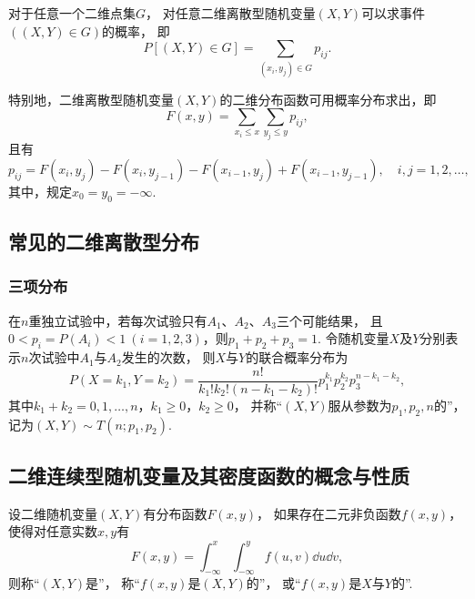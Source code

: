 \begin{theorem}
对于任意一个二维点集\(G\)，
对任意二维离散型随机变量\((X,Y)\)可以求事件\(((X,Y) \in G)\)的概率，
即\begin{equation*}
	P\left[(X,Y) \in G\right] = \sum_{(x_i,y_j) \in G} p_{ij}.
\end{equation*}

特别地，二维离散型随机变量\((X,Y)\)的二维分布函数可用概率分布求出，即\begin{equation*}
	F(x,y) = \sum_{x_i \leq x}\sum_{y_j \leq y} p_{ij},
\end{equation*}且有\begin{equation*}
	p_{ij} = F(x_i,y_j) - F(x_i,y_{j-1}) - F(x_{i-1},y_j) + F(x_{i-1},y_{j-1}),
	\quad i,j = 1,2,\dotsc,
\end{equation*}
其中，规定\(x_0 = y_0 = -\infty\).
\end{theorem}

\subsection{常见的二维离散型分布}
\subsubsection{三项分布}
\begin{definition}
在\(n\)重独立试验中，若每次试验只有\(A_1\)、\(A_2\)、\(A_3\)三个可能结果，
且\(0 < p_i = P(A_i) < 1\ (i=1,2,3)\)，则\(p_1 + p_2 + p_3 = 1\).
令随机变量\(X\)及\(Y\)分别表示\(n\)次试验中\(A_1\)与\(A_2\)发生的次数，
则\(X\)与\(Y\)的联合概率分布为\begin{equation*}
	P(X=k_1,Y=k_2)
	= \frac{n!}{k_1! k_2! (n-k_1-k_2)!} p_1^{k_1} p_2^{k_2} p_3^{n-k_1-k_2},
\end{equation*}
其中\(k_1+k_2 = 0,1,\dotsc,n\)，\(k_1 \geq 0\)，\(k_2 \geq 0\)，
并称“\((X,Y)\)服从参数为\(p _1,p_2,n\)的”，
记为\((X,Y) \sim T(n;p_1,p_2)\).
\end{definition}

\subsection{二维连续型随机变量及其密度函数的概念与性质}
\begin{definition}
设二维随机变量\((X,Y)\)有分布函数\(F(x,y)\)，
如果存在二元非负函数\(f(x,y)\)，
使得对任意实数\(x,y\)有\begin{equation*}
	F(x,y) = \int_{-\infty}^x \int_{-\infty}^y f(u,v) \dd{u} \dd{v},
\end{equation*}
则称“\((X,Y)\)是”，
称“\(f(x,y)\)是\((X,Y)\)的”，
或“\(f(x,y)\)是\(X\)与\(Y\)的”.
\end{definition}


